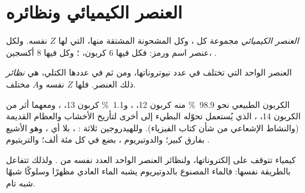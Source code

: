 \section{العنصر الكيميائي ونظائره}

\begin{definition}\label{def:g9:inside-the-atom:element}
\emph{العنصر الكيميائي} مجموعة كل ، وكل 
المشحونة المشتقة منها، التي لها  $Z$ نفسه. ولكل عنصر اسم
ورمز: فكل  فيها 6   كربون، ؛ وكل  فيها 8
  أكسجين، .
\end{definition}

\begin{definition}[النظائر]\label{def:g9:inside-the-atom:isotope}
 العنصر الواحد التي تختلف في عدد نيوتروناتها، ومن ثم في عددها الكتلي،
هي \emph{نظائر} ذلك العنصر. فلها $Z$ نفسه و$A$
مختلف.
\end{definition}

\begin{example}\label{ex:g9:inside-the-atom:isotopes}
الكربون الطبيعي نحو \qty{98.9}{\percent} منه كربون 12، ،
و\qty{1.1}{\percent} كربون 13، ، ومعهما أثر من
الكربون 14، ، الذي يُستعمل تحوّله البطيء إلى  أخرى
لتأريخ الأخشاب والعظام القديمة (والنشاط الإشعاعي من شأن كتاب الفيزياء).
وللهيدروجين ثلاثة : ، بلا أي ، وهو الأشيع بفارق
كبير؛ والدوتيريوم ، بضع  في كل مئة ألف؛ والتريتيوم
.
\end{example}

\begin{proposition}\label{prop:g9:inside-the-atom:alike}
كيمياء  تتوقف على إلكتروناتها، ولنظائر العنصر الواحد العدد نفسه من
. ولذلك تتفاعل  بالطريقة نفسها: فالماء المصنوع بالدوتيريوم
يشبه الماء العادي مظهرًا وسلوكًا شبهًا شبه تام.
\end{proposition}

